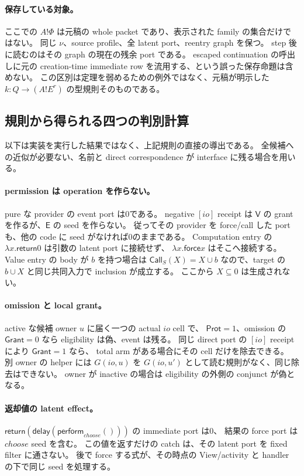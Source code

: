 \documentclass[11pt,a4paper]{article}
\newcommand{\Ret}{\mathsf{return}}
\newcommand{\Force}{\mathsf{force}}
\newcommand{\Delay}{\mathsf{delay}}
\begin{document}
\paragraph{保存している対象。}
ここでの \(A!\Phi\) は元稿の whole packet であり、表示された family の集合だけではない。
同じ \(\nu\)、source profile、全 latent port、reentry graph を保つ。
step 後に読むのはその graph の現在の残余 port である。
escaped continuation の呼出しに元の creation-time immediate row を流用する、という誤った保存命題は含めない。
この区別は定理を弱めるための例外ではなく、元稿が明示した \(k:Q\to(A!E^r)\) の型規則そのものである。

\subsection{規則から得られる四つの判別計算}

以下は実装を実行した結果ではなく、上記規則の直接の導出である。
全候補への近似が必要ない、名前と direct correspondence が interface に残る場合を用いる。

\paragraph{permission は operation を作らない。}
pure な provider の event port は0である。
negative \([io]\) receipt は \(\mathsf V\) の grant を作るが、\(\mathsf E\) の seed を作らない。
従ってその provider を force/call した port も、他の code に seed がなければ0のままである。
Computation entry の \(\lambda x.\Ret 0\) は引数の latent port に接続せず、
\(\lambda x.\Force x\) はそこへ接続する。
Value entry の body が \(b\) を持つ場合は
\(\mathsf{Call}_S(X)=X\cup b\) なので、target の \(b\cup X\) と同じ共同入力で inclusion が成立する。
ここから \(X\subseteq0\) は生成されない。

\paragraph{omission と local grant。}
active な候補 owner \(u\) に届く一つの actual \(io\) cell で、
\(\mathsf{Prot}=1\)、omission の \(\mathsf{Grant}=0\) なら eligibility は偽、event は残る。
同じ direct port の \([io]\) receipt により \(\mathsf{Grant}=1\) なら、
total arm がある場合にその cell だけを除去できる。
別 owner の helper には \(G(io,u)\) を \(G(io,u')\) として読む規則がなく、同じ除去はできない。
owner が inactive の場合は eligibility の外側の conjunct が偽となる。

\paragraph{返却値の latent effect。}
\(\Ret(\Delay(\mathsf{perform}_{choose}()))\) の immediate port は0、
結果の force port は \(choose\) seed を含む。
この値を返すだけの catch は、その latent port を fixed filter に通さない。
後で force する式が、その時点の View/activity と handler の下で同じ seed を処理する。
\end{document}
